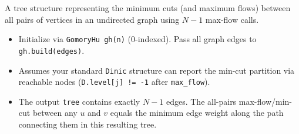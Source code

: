 
A tree structure representing the minimum cuts (and maximum flows) between all pairs of vertices in an undirected graph using $N-1$ max-flow calls.



\begin{itemize}
    \item Initialize via \lstinline|GomoryHu gh(n)| ($0$-indexed). Pass all graph edges to \lstinline|gh.build(edges)|.
    \item Assumes your standard \lstinline|Dinic| structure can report the min-cut partition via reachable nodes (\lstinline|D.level[j] != -1| after \lstinline|max_flow|).
    \item The output \lstinline|tree| contains exactly $N-1$ edges. The all-pairs max-flow/min-cut between any $u$ and $v$ equals the minimum edge weight along the path connecting them in this resulting tree.
\end{itemize}
